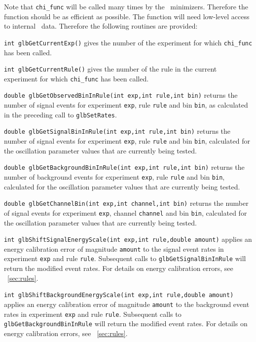 Note that {\tt chi\_func} will be called many times by the \GLOBES\ minimizers.
Therefore the function should be as efficient as possible. The function
will need low-level access to internal \GLOBES\ data. Therefore the following
routines are provided:
\begin{function}
{\tt int glbGetCurrentExp()} gives the number of the experiment for which
{\tt chi\_func} has been called.
\end{function}
\begin{function}
{\tt int glbGetCurrentRule()} gives the number of the rule in the current experiment
for which {\tt chi\_func} has been called.
\end{function}
\begin{function}
{\tt double glbGetObservedBinInRule(int exp,int rule,int bin)} returns the number of
signal events for experiment {\tt exp}, rule {\tt rule} and bin {\tt bin}, as calculated
in the preceding call to {\tt glbSetRates}.
\end{function}
\begin{function}
{\tt double glbGetSignalBinInRule(int exp,int rule,int bin)} returns the number of
signal events for experiment {\tt exp}, rule {\tt rule} and bin {\tt bin}, calculated
for the oscillation parameter values that are currently being tested.
\end{function}
\begin{function}
{\tt double glbGetBackgroundBinInRule(int exp,int rule,int bin)} returns the number of
background events for experiment {\tt exp}, rule {\tt rule} and bin {\tt bin}, calculated
for the oscillation parameter values that are currently being tested.
\end{function}
\begin{function}
{\tt double glbGetChannelBin(int exp,int channel,int bin)} returns the number of
signal events for experiment {\tt exp}, channel {\tt channel} and bin {\tt bin}, calculated
for the oscillation parameter values that are currently being tested.
\end{function}
\begin{function}
{\tt int glbShiftSignalEnergyScale(int exp,int rule,double amount)} applies an energy
calibration error of magnitude {\tt amount} to the signal event rates in experiment
{\tt exp} and rule {\tt rule}. Subsequent calls to {\tt glbGetSignalBinInRule} will
return the modified event rates. For details on energy calibration errors, see
\Sec~\ref{sec:rules}.
\end{function}
\begin{function}
{\tt int glbShiftBackgroundEnergyScale(int exp,int rule,double amount)} applies an energy
calibration error of magnitude {\tt amount} to the background event rates in experiment
{\tt exp} and rule {\tt rule}. Subsequent calls to {\tt glbGetBackgroundBinInRule} will
return the modified event rates. For details on energy calibration errors, see
\Sec~\ref{sec:rules}.
\end{function}


